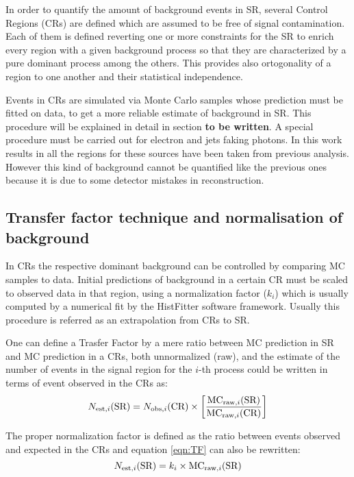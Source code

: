 In order to quantify the amount of background events in SR, several Control Regions (CRs) are defined which are assumed to be free of signal contamination. Each of them is defined reverting one or more constraints for the SR to enrich every region with a given background process so that they are characterized by a pure dominant process among the others. This provides also ortogonality of a region to one another and their statistical independence.

Events in CRs are simulated via Monte Carlo samples whose prediction must be fitted on data, to get a more reliable estimate of background in SR. This procedure will be explained in detail in section {\bfseries to be written}. A special procedure must be carried out for electron and jets faking photons. In this work results in all the regions for these sources have been taken from previous analysis. However this kind of background cannot be quantified like the previous ones because it is due to some detector mistakes in reconstruction.



\subsection{Transfer factor technique and normalisation of background}
In CRs the respective dominant background can be controlled by comparing MC samples to data. Initial predictions of background in a certain CR must be scaled to observed data in that region, using a normalization factor ($k_{i}$) which is usually computed by a numerical fit by the HistFitter software framework. Usually this procedure is referred as an extrapolation from CRs to SR.

One can define a Trasfer Factor by a mere ratio between MC prediction in SR and MC prediction in a CRs, both unnormalized (raw), and the estimate of the number of events in the signal region for the $i$-th process could be written in terms of event observed in the CRs as:
\begin{equation}
  \label{eqn:TF}
  N_{\textup{est},i}(\text{SR}) =  N_{\textup{obs},i}({\text{CR}}) \times \left[\frac{\text{MC}_{\textup{raw},i}(\text{SR})}{\text{MC}_{\textup{raw},i}(\text{CR})} \right]
\end{equation}

The proper normalization factor is defined as the ratio between events observed and expected in the CRs and equation \ref{eqn:TF} can also be rewritten:
\begin{equation}
  N_{\textup{est},i}(\text{SR}) = k_{i}\times\text{MC}_{\textup{raw},i}(\text{SR})
\end{equation}

